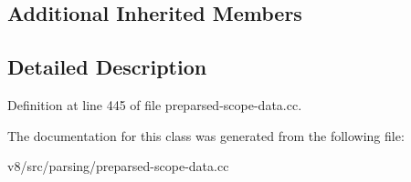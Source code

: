 \subsection*{Additional Inherited Members}


\subsection{Detailed Description}


Definition at line 445 of file preparsed-\/scope-\/data.\+cc.



The documentation for this class was generated from the following file\+:\begin{DoxyCompactItemize}
\item 
v8/src/parsing/preparsed-\/scope-\/data.\+cc\end{DoxyCompactItemize}
